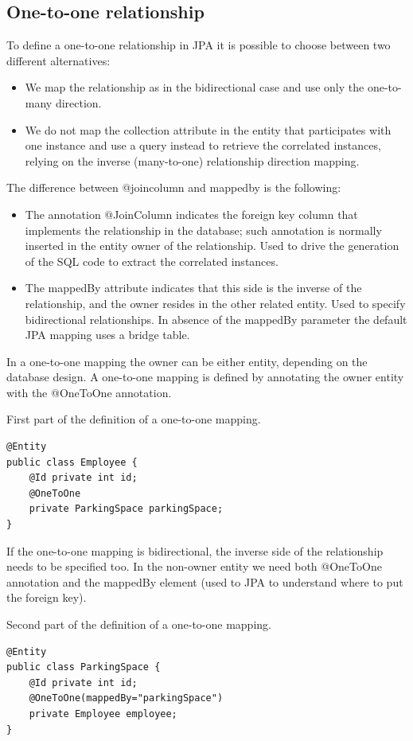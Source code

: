 \documentclass[12pt, a4paper]{report}
\begin{document}
        \subsection{One-to-one relationship}
        To define a one-to-one relationship in JPA it is possible to choose between two different alternatives: 
        \begin{itemize}
            \item We map the relationship as in the bidirectional case and use only the one-to-many direction. 
            \item We do not map the collection attribute in the entity that participates with one instance and use a query instead to retrieve the correlated instances, 
                relying on the inverse (many-to-one) relationship direction mapping.
        \end{itemize}
        The difference between @joincolumn and mappedby is the following: 
        \begin{itemize}
            \item The annotation @JoinColumn indicates the foreign key column that implements the relationship in the database; such annotation is normally inserted in 
                the entity owner of the relationship. Used to drive the generation of the SQL code to extract the correlated instances.
            \item The mappedBy attribute indicates that this side is the inverse of the relationship, and the owner resides in the other related entity. Used to 
                specify bidirectional relationships. In absence of the mappedBy parameter the default JPA mapping uses a bridge table.
        \end{itemize}
        In a one-to-one mapping the owner can be either entity, depending on the database design. A one-to-one mapping is defined by annotating the owner entity 
        with the @OneToOne annotation.
        \begin{example}
            First part of the definition of a one-to-one mapping. 
            \begin{lstlisting}[style=Java]
@Entity
public class Employee {
    @Id private int id;
    @OneToOne
    private ParkingSpace parkingSpace;
}
            \end{lstlisting}
        \end{example}
        If the one-to-one mapping is bidirectional, the inverse side of the relationship needs to be specified too. In the non-owner entity we need both @OneToOne annotation 
        and the mappedBy element (used to JPA to understand where to put the foreign key).
        \begin{example}
        Second part of the definition of a one-to-one mapping. 
            \begin{lstlisting}[style=Java]
@Entity
public class ParkingSpace {
    @Id private int id;
    @OneToOne(mappedBy="parkingSpace")
    private Employee employee;
}
            \end{lstlisting}
        \end{example}
\end{document}
